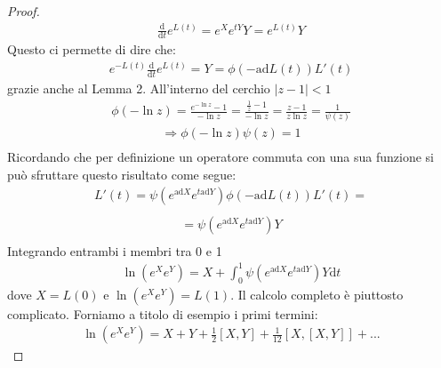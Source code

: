 \begin{proof}
\begin{equation*}
\begin{split}
\frac{\textrm{d}}{\textrm{d}t}e^{L\left(t\right)}=e^Xe^{tY}Y=e^{L\left(t\right)}Y
\end{split}\end{equation*}
Questo ci permette di dire che:
\begin{equation*}\begin{split}
e^{-L\left(t\right)}\frac{\textrm{d}}{\textrm{d}t}e^{L\left(t\right)}=Y=\phi\left(-\textrm{ad}L\left(t\right)\right)L'\left(t\right)
\end{split}\end{equation*}
grazie anche al Lemma 2.
All'interno del cerchio $|z-1|<1$
\begin{equation*}\begin{split}
\phi\left(-\ln{z}\right)=\frac{e^{-\ln{z}}-1}{-\ln{z}}=\frac{\frac{1}{z}-1}{-\ln{z}}=\frac{z-1}{z\ln{z}}=\frac{1}{\psi\left(z\right)}
\end{split}\end{equation*}
\begin{equation*}\begin{split}
\Longrightarrow \phi\left(-\ln{z}\right)\psi \left(z\right)=1 \\
\end{split}\end{equation*}
Ricordando che per definizione un operatore commuta con una sua funzione si può sfruttare questo risultato come segue:
\begin{equation*}\begin{split}
L'\left(t\right)=\psi\left(e^{\textrm{ad}X}e^{t\textrm{ad}Y}\right)\phi \left(-\textrm{ad}L\left(t\right)\right)L'\left(t\right)= \\
\end{split}\end{equation*}
\begin{equation*}\begin{split}
=\psi\left(e^{\textrm{ad}X}e^{t\textrm{ad}Y}\right)Y \\
\end{split}\end{equation*}
Integrando entrambi i membri tra 0 e 1
\begin{equation*}\begin{split}
\ln{\left(e^Xe^Y\right)}=X+\int_{0}^{1}{\psi\left(e^{\textrm{ad}X}e^{t\textrm{ad}Y}\right)Y  \textrm{d}t}
\end{split}\end{equation*}
dove $X=L(0)$ e $\ln(e^Xe^Y)=L(1).$
Il calcolo completo è piuttosto complicato. Forniamo a titolo di esempio i primi termini:
\begin{equation*}\begin{split}
\ln\left(e^Xe^Y\right)=X+Y+\frac{1}{2}\left[X,Y\right]+\frac{1}{12}\left[X,\left[X,Y\right]\right]+...
\end{split}\end{equation*}
\end{proof}

